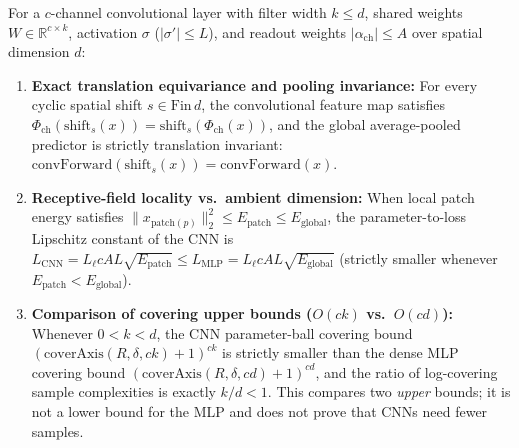 \begin{lemma}\label{lem:convolutional_generalization}
\leanok
{}
For a $c$-channel convolutional layer with filter width $k \le d$, shared weights $W\in\mathbb{R}^{c\times k}$, activation $\sigma$ ($|\sigma'|\le L$), and readout weights $|\alpha_{\mathrm{ch}}|\le A$ over spatial dimension $d$:
\begin{enumerate}
\item \textbf{Exact translation equivariance and pooling invariance:} For every cyclic spatial shift $s\in\mathrm{Fin}\,d$, the convolutional feature map satisfies $\Phi_{\mathrm{ch}}(\mathrm{shift}_s(x)) = \mathrm{shift}_s(\Phi_{\mathrm{ch}}(x))$, and the global average-pooled predictor is strictly translation invariant: $\mathrm{convForward}(\mathrm{shift}_s(x)) = \mathrm{convForward}(x)$.
\item \textbf{Receptive-field locality vs.\ ambient dimension:} When local patch energy satisfies $\|x_{\mathrm{patch}(p)}\|_2^2 \le E_{\mathrm{patch}} \le E_{\mathrm{global}}$, the parameter-to-loss Lipschitz constant of the CNN is $L_{\mathrm{CNN}} = L_\ell c A L\sqrt{E_{\mathrm{patch}}} \le L_{\mathrm{MLP}} = L_\ell c A L\sqrt{E_{\mathrm{global}}}$ (strictly smaller whenever $E_{\mathrm{patch}} < E_{\mathrm{global}}$).
\item \textbf{Comparison of covering upper bounds ($O(ck)$ vs.\ $O(cd)$):} Whenever $0 < k < d$, the CNN parameter-ball covering bound $(\mathrm{coverAxis}(R,\delta,ck)+1)^{ck}$ is strictly smaller than the dense MLP covering bound $(\mathrm{coverAxis}(R,\delta,cd)+1)^{cd}$, and the ratio of log-covering sample complexities is exactly $k/d < 1$. This compares two \emph{upper} bounds; it is not a lower bound for the MLP and does not prove that CNNs need fewer samples.
\end{enumerate}
\end{lemma}
